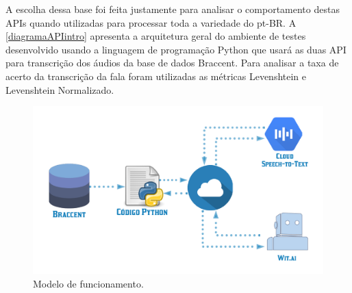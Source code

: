 A escolha dessa base foi feita justamente para analisar o comportamento destas APIs quando utilizadas para processar toda a variedade do pt-BR. A \autoref{diagramaAPIintro} apresenta a arquitetura geral do ambiente de testes desenvolvido usando a linguagem de programação Python que usará as duas API para transcrição dos áudios da base de dados Braccent. Para analisar a taxa de acerto da transcrição da fala foram utilizadas as métricas Levenshtein e  Levenshtein Normalizado. 

\begin{figure}[h!]
\centering
\caption{Modelo de funcionamento.\label{diagramaAPIintro}}
\includegraphics[width=115mm]{images/Diagramas/APIs.png}
\end{figure}






